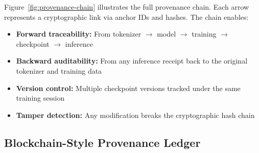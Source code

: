 \documentclass[11pt,a4paper]{article}
\begin{document}
Figure~\ref{fig:provenance-chain} illustrates the full provenance chain. Each arrow represents a cryptographic link via anchor IDs and hashes. The chain enables:

\begin{itemize}
    \item \textbf{Forward traceability:} From tokenizer $\rightarrow$ model $\rightarrow$ training $\rightarrow$ checkpoint $\rightarrow$ inference
    \item \textbf{Backward auditability:} From any inference receipt back to the original tokenizer and training data
    \item \textbf{Version control:} Multiple checkpoint versions tracked under the same training session
    \item \textbf{Tamper detection:} Any modification breaks the cryptographic hash chain
\end{itemize}

\subsection{Blockchain-Style Provenance Ledger}
\end{document}
